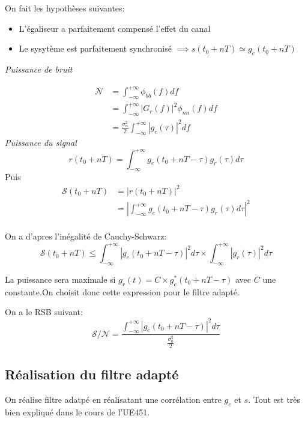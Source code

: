 \documentclass[main.tex]{subfiles}
\begin{document}
On fait les hypothèses suivantes:
\begin{itemize}
\item L'égaliseur a parfaitement compensé l'effet du canal
\item Le sysytème est parfaitement synchronisé $\implies s(t_0+nT)\simeq g_e(t_0+nT)$
\end{itemize}


\begin{defin}
  \emph{Puissance de bruit}

\[
  \begin{aligned}
    \mathcal{N} &=\int_{-\infty}^{+\infty} \phi_{b b}(f) d f \\ &=\int_{-\infty}^{+\infty}\left|G_{r}(f)\right|^{2} \phi_{n n}(f) d f \\ &=\frac{\sigma_{n}^{2}}{2} \int_{-\infty}^{+\infty}\left|g_{r}(\tau)\right|^{2} d f
  \end{aligned}
\]
\emph{Puissance du signal}
\[
r\left(t_{0}+n T\right)=\int_{-\infty}^{+\infty} g_{e}\left(t_{0}+n T-\tau\right) g_{r}(\tau) d \tau
\]
Puis
\[
\begin{aligned} \mathcal{S}\left(t_{0}+n T\right) &=\left|r\left(t_{0}+n T\right)\right|^{2} \\ &=\left|\int_{-\infty}^{+\infty} g_{e}\left(t_{0}+n T-\tau\right) g_{r}(\tau) d \tau\right|^{2} \\  \end{aligned}
\]
\end{defin}
\begin{prop}
  On  a d'apres l'inégalité de Cauchy-Schwarz:
  \[
 \mathcal{S}\left(t_{0}+n T\right) \leq \int_{-\infty}^{+\infty}\left|g_{e}\left(t_{0}+n T-\tau\right)\right|^{2} d \tau \times \int_{-\infty}^{+\infty}\left|g_{r}(\tau)\right|^{2} d \tau
  \]

  La puissance sera maximale si $g_r(t) =C\times g_e^*(t_0+nT-\tau)$ avec $C$ une constante.On choisit donc cette expression pour le filtre adapté.

  On a le RSB suivant:
  \[
\mathcal{S} / \mathcal{N}=\frac{\int_{-\infty}^{+\infty}\left|g_{e}\left(t_{0}+n T-\tau\right)\right|^{2} d \tau}{\frac{\sigma_{0}^{2}}{2}}
\]
\end{prop}

\subsection{Réalisation du filtre adapté}

On réalise filtre adatpé en réalisatant une corrélation entre $g_e$ et $s$. Tout est très bien expliqué dans le cours de l'UE451.
\end{document}
